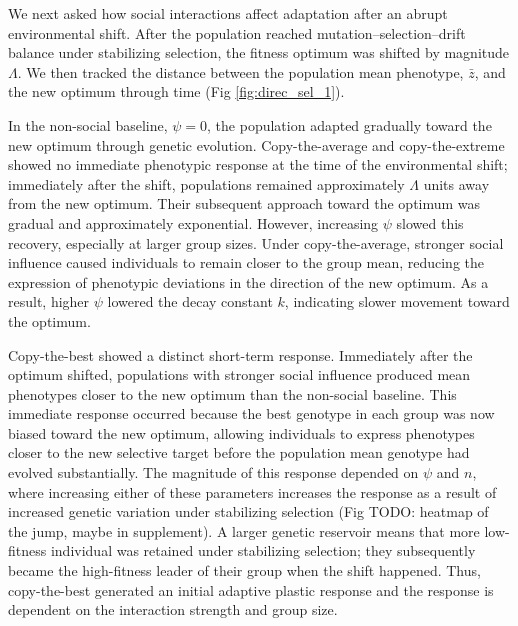\documentclass{article}
\begin{document}
We next asked how social interactions affect adaptation after an abrupt environmental shift. After the population reached mutation–selection–drift balance under stabilizing selection, the fitness optimum was shifted by magnitude $\Lambda$. We then tracked the distance between the population mean phenotype, $\bar{z}$, and the new optimum through time (Fig \ref{fig:direc_sel_1}).

In the non-social baseline, $\psi=0$, the population adapted gradually toward the new optimum through genetic evolution. Copy-the-average and copy-the-extreme showed no immediate phenotypic response at the time of the environmental shift; immediately after the shift, populations remained approximately $\Lambda$ units away from the new optimum. Their subsequent approach toward the optimum was gradual and approximately exponential. However, increasing $\psi$ slowed this recovery, especially at larger group sizes. Under copy-the-average, stronger social influence caused individuals to remain closer to the group mean, reducing the expression of phenotypic deviations in the direction of the new optimum. As a result, higher $\psi$ lowered the decay constant $k$, indicating slower movement toward the optimum.

Copy-the-best showed a distinct short-term response. Immediately after the optimum shifted, populations with stronger social influence produced mean phenotypes closer to the new optimum than the non-social baseline. This immediate response occurred because the best genotype in each group was now biased toward the new optimum, allowing individuals to express phenotypes closer to the new selective target before the population mean genotype had evolved substantially. The magnitude of this response depended on $\psi$ and $n$, where increasing either of these parameters increases the response as a result of increased genetic variation under stabilizing selection (Fig TODO: heatmap of the jump, maybe in supplement). A larger genetic reservoir means that more low-fitness individual was retained under stabilizing selection; they subsequently became the high-fitness leader of their group when the shift happened. Thus, copy-the-best generated an initial adaptive plastic response and the response is dependent on the interaction strength and group size. 
\end{document}
